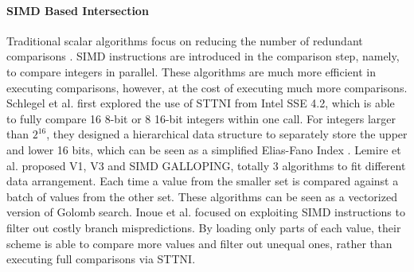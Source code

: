 \paragraph{SIMD Based Intersection}
Traditional scalar algorithms focus on reducing the number of redundant comparisons \cite{Demaine2001Experiments,barbay2006faster,inoue2014faster,Schlegel2011Fast}.
SIMD instructions are introduced in the comparison step, namely, to compare integers in parallel.
These algorithms are much more efficient in executing comparisons, however, at the cost of executing much more comparisons.
Schlegel et al. \cite{Schlegel2011Fast} first explored the use of STTNI from Intel SSE 4.2, which is able to fully compare 16 8-bit or 8 16-bit integers within one call.
For integers larger than $ 2^{16} $, they designed a hierarchical data structure to separately store the upper and lower 16 bits, which can be seen as a simplified Elias-Fano Index \cite{ottaviano2014partitioned}.
Lemire et al. \cite{lemire2016simd} proposed V1, V3 and SIMD GALLOPING, totally 3 algorithms to fit different data arrangement.
Each time a value from the smaller set is compared against a batch of values from the other set.
These algorithms can be seen as a vectorized version of Golomb search.
Inoue et al. \cite{inoue2014faster} focused on exploiting SIMD instructions to filter out costly branch mispredictions.
By loading only parts of each value, their scheme is able to compare more values and filter out unequal ones, rather than executing full comparisons via STTNI.
